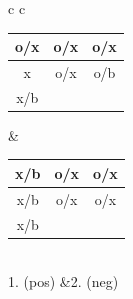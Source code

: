 \documentclass[10pt]{article}
\begin{document}
\begin{figure}[!ht]

\begin{subfigure}{\textwidth}
\centering
\begin{tabular}{c c}
	\begin{small}
	\begin{tabular}{c|c|c}
	\hspace*{-0.4em}o/x\hspace*{-0.4em}&\hspace*{-0.4em}o/x\hspace*{-0.4em}&\hspace*{-0.4em}o/x\hspace*{-0.4em}\\ \hline
	\hspace*{-0.4em}x\hspace*{-0.4em}&\hspace*{-0.4em}o/x\hspace*{-0.4em}&\hspace*{-0.4em}o/b\hspace*{-0.4em}\\ \hline
	\hspace*{-0.4em}x/b\hspace*{-0.4em}&&
	\end{tabular}
	\end{small}
	&
	\begin{small}
	\begin{tabular}{c|c|c}
	\hspace*{-0.4em}x/b\hspace*{-0.4em}&\hspace*{-0.4em}o/x\hspace*{-0.4em}&\hspace*{-0.4em}o/x\hspace*{-0.4em}\\ \hline
	\hspace*{-0.4em}x/b\hspace*{-0.4em}&\hspace*{-0.4em}o/x\hspace*{-0.4em}&\hspace*{-0.4em}o/x\hspace*{-0.4em}\\ \hline
	\hspace*{-0.4em}x/b\hspace*{-0.4em}&&
	\end{tabular}
	\end{small}\\
	1. (pos) &2. (neg)


\end{tabular}
\end{subfigure}
\end{figure}
\end{document}
